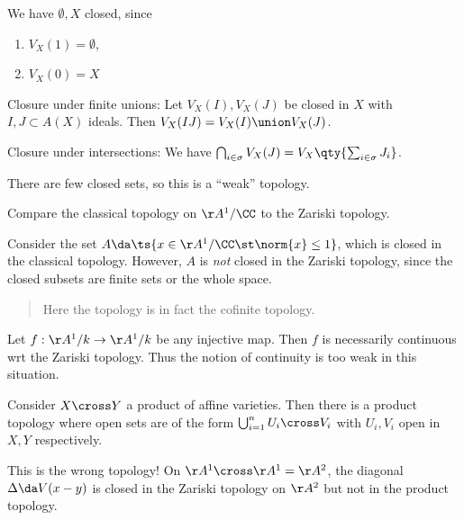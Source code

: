 We have \(\emptyset, X\) closed, since

\begin{enumerate}
\def\labelenumi{\arabic{enumi}.}
\tightlist
\item
  \(V_X(1) = \emptyset\),
\item
  \(V_X(0) = X\)
\end{enumerate}

Closure under finite unions: Let \(V_X(I), V_X(J)\) be closed in \(X\)
with \(I, J \subset A(X)\) ideals. Then
\(V_X(IJ) = V_X(I) \union V_X(J)\).

Closure under intersections: We have
\(\bigcap_{i\in \sigma} V_X(J) = V_X\qty{ \sum_{i\in \sigma} J_i}\).

\begin{remark}

There are few closed sets, so this is a ``weak'' topology.

\end{remark}

\begin{example}

Compare the classical topology on \(\AA^1/\CC\) to the Zariski topology.

Consider the set \(A\da \ts{x\in \AA^1/\CC \st \norm{x} \leq 1}\), which
is closed in the classical topology. However, \(A\) is \emph{not} closed
in the Zariski topology, since the closed subsets are finite sets or the
whole space.

\begin{quote}
Here the topology is in fact the cofinite topology.
\end{quote}

\end{example}

\begin{example}

Let \(f: \AA^1/k\to \AA^1/k\) be any injective map. Then \(f\) is
necessarily continuous wrt the Zariski topology. Thus the notion of
continuity is too weak in this situation.

\end{example}

\begin{example}

Consider \(X\cross Y\) a product of affine varieties. Then there is a
product topology where open sets are of the form
\(\bigcup_{i=1}^n U_i \cross V_i\) with \(U_i, V_i\) open in \(X, Y\)
respectively.

This is the wrong topology! On \(\AA^1 \cross \AA^1 = \AA^2\), the
diagonal \(\Delta \da V(x-y)\) is closed in the Zariski topology on
\(\AA^2\) but not in the product topology.

\end{example}

